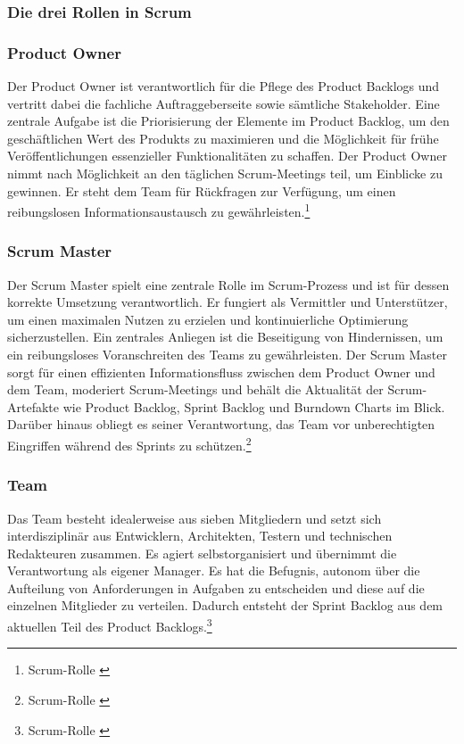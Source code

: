 \subsubsection{Die drei Rollen in Scrum}
\subsubsection*{Product Owner}
Der Product Owner ist verantwortlich für die Pflege des Product Backlogs und vertritt dabei die fachliche Auftraggeberseite
sowie sämtliche Stakeholder. Eine zentrale Aufgabe ist die Priorisierung der Elemente im Product Backlog, um den
geschäftlichen Wert des Produkts zu maximieren und die Möglichkeit für frühe Veröffentlichungen essenzieller Funktionalitäten
zu schaffen. Der Product Owner nimmt nach Möglichkeit an den täglichen Scrum-Meetings teil, um Einblicke zu gewinnen. Er
steht dem Team für Rückfragen zur Verfügung, um einen reibungslosen Informationsaustausch zu gewährleisten.\footnote{Scrum-Rolle \cite{Product Owner}}

\subsubsection*{Scrum Master}
Der Scrum Master spielt eine zentrale Rolle im Scrum-Prozess und ist für dessen korrekte Umsetzung verantwortlich. Er
fungiert als Vermittler und Unterstützer, um einen maximalen Nutzen zu erzielen und kontinuierliche Optimierung sicherzustellen.
Ein zentrales Anliegen ist die Beseitigung von Hindernissen, um ein reibungsloses Voranschreiten des Teams zu gewährleisten.
Der Scrum Master sorgt für einen effizienten Informationsfluss zwischen dem Product Owner und dem Team, moderiert Scrum-Meetings
und behält die Aktualität der Scrum-Artefakte wie Product Backlog, Sprint Backlog und Burndown Charts im Blick. Darüber
hinaus obliegt es seiner Verantwortung, das Team vor unberechtigten Eingriffen während des Sprints zu schützen.\footnote{Scrum-Rolle \cite{Scrum Master}}

\subsubsection*{Team}
Das Team besteht idealerweise aus sieben Mitgliedern und setzt sich interdisziplinär aus Entwicklern, Architekten, Testern
und technischen Redakteuren zusammen. Es agiert selbstorganisiert und übernimmt die Verantwortung als eigener Manager. Es
hat die Befugnis, autonom über die Aufteilung von Anforderungen in Aufgaben zu entscheiden und diese auf die einzelnen
Mitglieder zu verteilen. Dadurch entsteht der Sprint Backlog aus dem aktuellen Teil des Product Backlogs.\footnote{Scrum-Rolle \cite{Team}}

